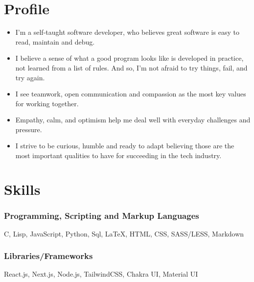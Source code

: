 \documentclass[11pt, oneside, a4paper, titlepage]{article}
\newcommand\skillsVSpace{\vspace{-0.3cm}}
\begin{document}
\begin{tcolorbox}
  \begin{minipage}[t]{8cm}
    \vspace*{-0.5cm}
    \begin{tcolorbox}[grow to left by=0.6cm,colback=gray!25,colframe=white]

      \section*{Profile}
      \begin{itemize}
        \item{
      I'm a self-taught software developer,
      who believes great software is easy to read,
      maintain and debug.
          }
      \item{
      I believe a sense of what a good program looks like
      is developed in practice, not learned from a list of rules.
      And so, I'm not afraid to try things, fail, and try again.
        }
        \item{
      I see teamwork, open communication and compassion
      as the most key values for working together.
          }
        \item{
      Empathy, calm, and optimism
      help me deal well with everyday challenges and pressure.
        }
      \item{
      I strive to be curious, humble and ready to adapt
      believing those are the most important qualities to have
      for succeeding in the tech industry.
        }
      \end{itemize}


      \section*{Skills}
        \subsubsection{Programming, Scripting and Markup Languages}
        C, Lisp, JavaScript, Python, Sql, {\LaTeX}, HTML, CSS, SASS/LESS, Markdown
        \skillsVSpace
        \subsubsection{Libraries/Frameworks}
        React.js, Next.js, Node.js, TailwindCSS, Chakra UI, Material UI


\end{tcolorbox}
\end{minipage}
\end{tcolorbox}
\end{document}
